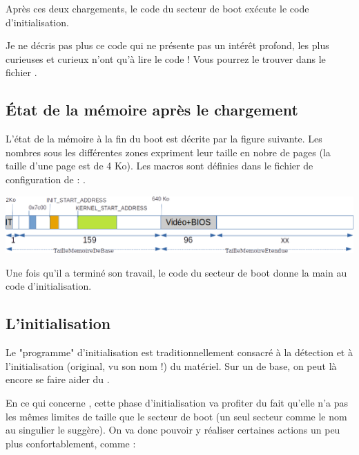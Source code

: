    Après ces deux chargements, le code du secteur de boot exécute le
code d'initialisation.

   Je ne décris pas plus ce code qui ne présente pas un intérêt
profond, les plus curieuses et curieux n'ont qu'à lire le code ! Vous
pourrez le trouver dans le fichier .
   
%
\subsection{État de la mémoire après le chargement}

   L'état de la mémoire à la fin du boot est décrite par la figure
suivante. Les nombres sous les différentes zones expriment leur taille
en nobre de pages (la taille d'une page est de 4 Ko). Les macros sont
définies dans le fichier de configuration de \manux :
.

\includegraphics{images/etat-memoire-boot.png}


   Une fois qu'il a terminé son travail, le code du secteur de boot
donne la main au code d'initialisation.
   
\subsection{L'initialisation}

   Le "programme" d'initialisation est traditionnellement consacré à la détection
et à l'initialisation (original, vu son nom !) du matériel. Sur un \pc de
base, on peut là encore se faire aider du \bios. 

   En ce qui concerne \manux, cette phase d'initialisation va profiter
du fait qu'elle n'a pas les mêmes limites de taille que le secteur de
boot (un seul secteur comme le nom au singulier le suggère). On va
donc pouvoir y réaliser certaines actions un peu plus confortablement,
comme :

